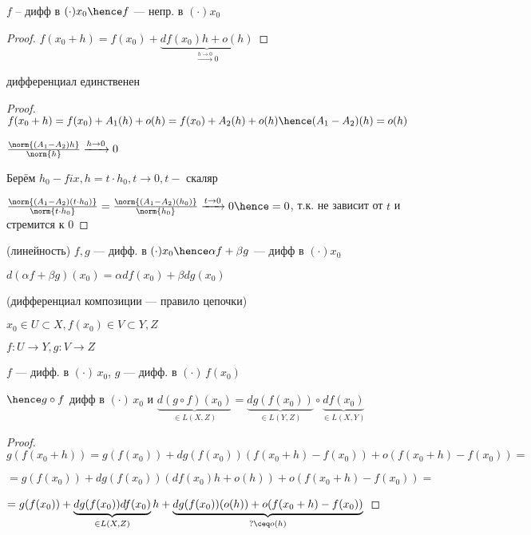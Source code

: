 \begin{properties}{}
    \item $f$ -- дифф в $(\cdot) x_0 \hence f $ --- непр. в $(\cdot) x_0$
    \begin{proof}
        $f(x_0 + h) = f(x_0) + \underbrace{df(x_0)h + o(h)}_{\xrightarrow{h \to 0}0}$
    \end{proof} 
    \item дифференциал единственен
    \begin{proof}
        $f(x_0 + h) = f(x_0) + A_1(h) + o(h) = f(x_0) + A_2(h) + o(h) \hence (A_1 - A_2)(h) = o(h)$

        $\frac{\norm{(A_1 - A_2)h}}{\norm{h}} \xrightarrow{h \to 0} 0$
    
        Берём $h_0 - fix, h = t \cdot h_0, t \to 0, t - $ скаляр

        $\frac{\norm{(A_1 - A_2)(t \cdot h_0)}}{\norm{t \cdot h_0}}  
        = \frac{\norm{(A_1 - A_2)(h_0)}}{\norm{h_0}} \xrightarrow{t \to 0} 0 \hence 
        = 0$, т.к. не зависит от $t$ и стремится к $0$ 
    \end{proof}

    \item (линейность) $f, g$ --- дифф. в $(\cdot) x_0 \hence \alpha f + \beta g $ --- дифф  в $(\cdot) x_0 $
    
    $d(\alpha f + \beta g)(x_0) = \alpha df(x_0) + \beta dg(x_0)$

    \item (дифференциал композиции --- правило цепочки)
    
    $x_0 \in U \subset X, f(x_0) \in V \subset Y, Z$

    $f : U \to Y, g : V \to Z$

    $f$ --- дифф. в $(\cdot)\, x_0$, 
    $g$ --- дифф. в $(\cdot)\, f(x_0)$

    $\hence g \circ f $ дифф в $(\cdot)\, x_0$ и $\underbrace{d(g \circ f) (x_0)}_{\in L(X, Z)}  = \underbrace{dg(f(x_0))}_{\in L(Y, Z)} \circ \underbrace{df(x_0)}_{\in L(X, Y)}$
\newpage
    \begin{proof}
        $g(f(x_0 + h)) = g(f(x_0)) + dg(f(x_0))(f(x_0 + h) - f(x_0)) + o(f(x_0 + h) - f(x_0)) = $ 
        
        $= g(f(x_0)) + dg(f(x_0))(df(x_0)h + o(h)) + o(f(x_0 + h) - f(x_0)) = $


        $= g(f(x_0)) + \underbrace{dg(f(x_0)) df(x_0)}_{\in L(X, Z)} h + \underbrace{dg(f(x_0))(o(h)) + o(f(x_0 + h) - f(x_0))}_{?\ceq o(h)}$


\end{proof}
\end{properties}
